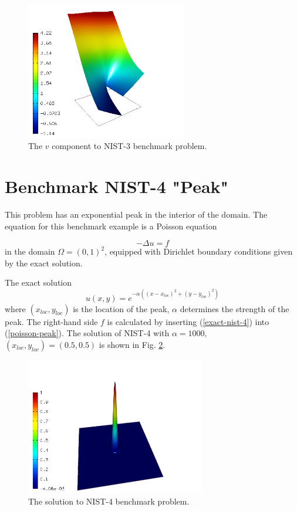 \documentclass[12pt]{elsarticle}
\begin{document}
\begin{figure}[!ht]
\centering
\includegraphics[height=6cm]{nist/nist-3/solution-v.png}
\caption{The $v$ component to NIST-3 benchmark problem.}
\label{fig:sln-nist03-v}
\end{figure}

\section{Benchmark NIST-4 "Peak"}
\label{sec:bench-4}

This problem has an exponential peak in the interior of the domain.
The equation for this benchmark example is a Poisson equation

\begin{equation} \label{poisson-peak}
-\Delta u = f
\end{equation}
in the domain $\Omega = (0, 1)^2$, equipped with Dirichlet
boundary conditions given by the exact solution.

The exact solution
\begin{equation}\label{exact-nist-4}
u(x,y) = e^{-\alpha ((x - x_{loc})^{2} + (y - y_{loc})^{2})}
\end{equation}
where $(x_{loc}, y_{loc})$ is the location of the peak,
$\alpha$ determines the strength of the peak.
The right-hand side $f$ is calculated by inserting (\ref{exact-nist-4}) into (\ref{poisson-peak}).
The solution of NIST-4 with $\alpha = 1000$, $(x_{loc}, y_{loc}) = (0.5, 0.5)$ is shown in Fig. \ref{fig:sln-nist04}.

\begin{figure}[!ht]
\centering
\includegraphics[height=6cm]{nist/nist-4/solution.png}
\caption{The solution to NIST-4 benchmark problem.}
\label{fig:sln-nist04}
\end{figure}
\end{document}

